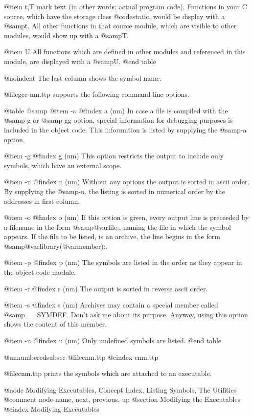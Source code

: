 {{{{{@item t,T
mark text (in other words: actual program code). Functions in your C
source, which have the storage class @code{static}, would be display
with a @samp{t}. All other functions in that source module, which are
visible to other modules, would show up with a @samp{T}.

@item U
All functions which are defined in other modules and referenced in
this module, are displayed with a @samp{U}.
@end table

@noindent
The last column shows the symbol name.

@file{gcc-nm.ttp} supports the following command line options.

@table @samp
@item -a
@findex a (nm)
In case a file is compiled with the @samp{-g} or @samp{-gg} option,
special information for debugging purposes is included in the object
code. This information is listed by supplying the @samp{-a} option.

@item -g
@findex g (nm)
This option restricts the output to include only symbols, which have an
external scope.

@item -n
@findex n (nm)
Without any options the output is sorted in ascii order. By supplying
the @samp{-n}, the listing is sorted in numerical order by the addresses
in first column.

@item -o
@findex o (nm)
If this option is given, every output line is preceeded by a filename in
the form @samp{@var{file}:}, naming the file in which the symbol
appears. If the file to be listed, is an archive, the line begins in the
form @samp{@var{library}(@var{member}):}.

@item -p
@findex p (nm)
The symbols are listed in the order as they appear in the object code
module.

@item -r
@findex r (nm)
The output is sorted in reverse ascii order.

@item -s
@findex s (nm)
Archives may contain a special member called @samp{__.SYMDEF}. Don't ask
me about its purpose. Anyway, using this option shows the content of this
member.

@item -u
@findex u (nm)
Only undefined symbols are listed.
@end table

@unnumberedsubsec @file{cnm.ttp}
@cindex cnm.ttp

@file{cnm.ttp} prints the symbols which are attached to an executable.

@node     Modifying Executables, Concept Index, Listing Symbols, The Utilities
@comment  node-name,             next,          previous,        up
@section Modifying the Executables
@cindex Modifying Executables

}}}}}
